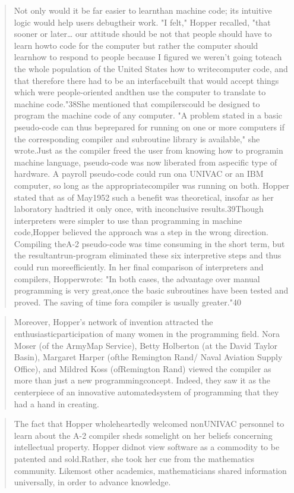 \begin{quotation}
Not only would it be far easier to learnthan machine code; its intuitive logic would help users debugtheir work. "I felt," Hopper recalled, "that sooner or later\dots
our attitude should be not that people should have to learn howto code for the computer but rather the computer should learnhow to respond to people because I figured we weren't going toteach the whole population of the United States how to writecomputer code, and that therefore there had to be an interfacebuilt that would accept things which were people-oriented andthen use the computer to translate to machine code."38She mentioned that compilerscould be designed to program the machine code of any computer. "A problem stated in a basic pseudo-code can thus beprepared for running on one or more computers if the corresponding compiler and subroutine library is available," she wrote.Just as the compiler freed the user from knowing how to programin machine language, pseudo-code was now liberated from aspecific type of hardware. A payroll pseudo-code could run ona UNIVAC or an IBM computer, so long as the appropriatecompiler was running on both. Hopper stated that as of May1952 such a benefit was theoretical, insofar as her laboratory hadtried it only once, with inconclusive results.39Though interpreters were simpler to use than programming in machine code,Hopper believed the approach was a step in the wrong direction. Compiling theA-2 pseudo-code was time consuming in the short term, but the resultantrun-program eliminated these six interpretive steps and thus could run moreefficiently. In her final comparison of interpreters and compilers, Hopperwrote: "In both cases, the advantage over manual programming is very great,once the basic subroutines have been tested and proved. The saving of time fora compiler is usually greater."40\end{quotation}
\begin{quotation}
Moreover, Hopper's network of invention attracted the enthusiasticparticipation of many women in the programming field.  Nora Moser (of the ArmyMap Service), Betty Holberton (at the David Taylor Basin), Margaret Harper (ofthe Remington Rand/ Naval Aviation Supply Office), and Mildred Koss (ofRemington Rand) viewed the compiler as more than just a new programmingconcept. Indeed, they saw it as the centerpiece of an innovative automatedsystem of programming that they had a hand in creating.\end{quotation}
\begin{quotation}
The fact that Hopper wholeheartedly welcomed nonUNIVAC personnel to learn about the A-2 compiler sheds somelight on her beliefs concerning intellectual property. Hopper didnot view software as a commodity to be patented and sold.Rather, she took her cue from the mathematics community. Likemost other academics, mathematicians shared information universally, in order to advance knowledge.\end{quotation}
